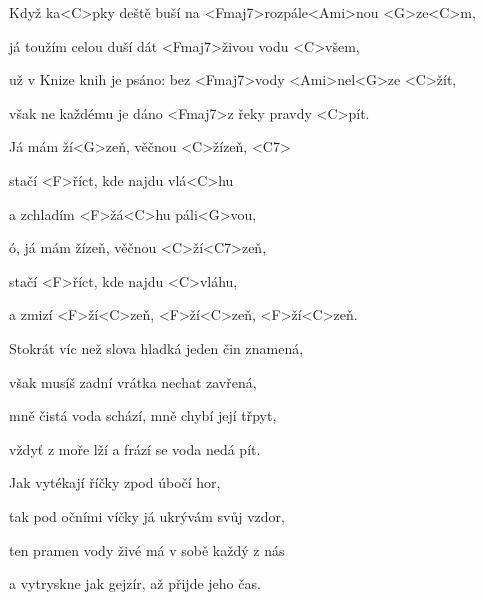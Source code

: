 

\zs
Když ka<C>pky deště buší na <Fmaj7>rozpále<Ami>nou <G>ze<C>m,

já toužím celou duší dát <Fmaj7>živou vodu <C>všem,

už v Knize knih je psáno: bez <Fmaj7>vody <Ami>nel<G>ze <C>žít,

však ne každému je dáno <Fmaj7>z řeky pravdy <C>pít.
\ks

\zr
Já mám ží<G>zeň, věčnou <C>žízeň, <C7>

stačí <F>říct, kde najdu vlá<C>hu

a zchladím <F>žá<C>hu páli<G>vou,

ó, já mám žízeň, věčnou <C>ží<C7>zeň,

stačí <F>říct, kde najdu <C>vláhu,

a zmizí <F>ží<C>zeň, <F>ží<C>zeň, <F>ží<C>zeň.
\kr

\zs
Stokrát víc než slova hladká jeden čin znamená,

však musíš zadní vrátka nechat zavřená,

mně čistá voda schází, mně chybí její třpyt,

vždyť z moře lží a frází se voda nedá pít.
\ks

\zr \kr

\zs
Jak vytékají říčky zpod úbočí hor,

tak pod očními víčky já ukrývám svůj vzdor,

ten pramen vody živé má v sobě každý z nás

a vytryskne jak gejzír, až přijde jeho čas.
\ks

\zr \kr \zr \kr

\kp
